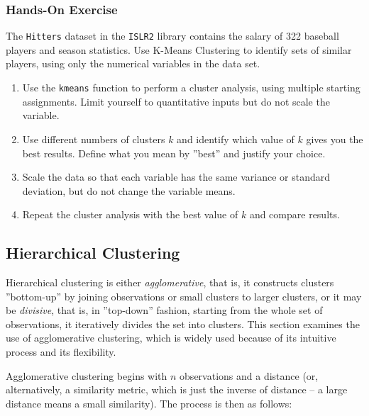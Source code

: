 \begin{tcolorbox}[colback=code]
\subsubsection*{Hands-On Exercise} 
The \texttt{Hitters} dataset in the \texttt{ISLR2} library contains the salary of 322 baseball players and season statistics. Use K-Means Clustering to identify sets of similar players, using only the numerical variables in the data set.

\begin{enumerate}
   \item Use the \texttt{kmeans} function to perform a cluster analysis, using multiple starting assignments. Limit yourself to quantitative inputs but do not scale the variable.
   \item Use different numbers of clusters $k$ and identify which value of $k$ gives you the best results. Define what you mean by ''best'' and justify your choice.
   \item Scale the data so that each variable has the same variance or standard deviation, but do not change the variable means. 
   \item Repeat the cluster analysis with the best value of $k$ and compare results.
\end{enumerate}
\end{tcolorbox}

\subsection{Hierarchical Clustering}

Hierarchical clustering is either \emph{agglomerative}, that is, it constructs clusters ''bottom-up'' by joining observations or small clusters to larger clusters, or it may be \emph{divisive}, that is, in ''top-down'' fashion, starting from the whole set of observations, it iteratively divides the set into clusters. This section examines the use of agglomerative clustering, which is widely used because of its intuitive process and its flexibility.

Agglomerative clustering begins with $n$ observations and a distance (or, alternatively, a similarity metric, which is just the inverse of distance -- a large distance means a small similarity). The process is then as follows:

